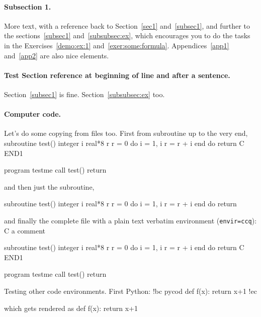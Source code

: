 \documentclass[%
oneside,                 %
final,                   %
10pt]{article}
\theoremstyle{definition}
\begin{document}
\paragraph{Subsection 1.}
\label{subsec1}
More text, with a reference back to
Section~\vref{sec1} and~\vref{subsec1}, and further to the
sections~\vref{subsec1} and~\vref{subsubsec:ex}, which
encourages you to do the tasks in the
Exercises~\vref{demo:ex:1} and~\vref{exer:some:formula}.
Appendices~\vref{app1} and~\vref{app2} are also nice elements.
\paragraph{Test Section reference at beginning of line and after a sentence.}
Section~\vref{subsec1} is fine.
Section~\vref{subsubsec:ex} too.
\paragraph{Computer code.}
Let's do some copying from files too. First from subroutine up to the very end,
\bfcod
      subroutine test()
      integer i
      real*8 r
      r = 0
      do i = 1, i
         r = r + i
      end do
      return
C     END1

      program testme
      call test()
      return

\efcod

and then just the subroutine,
\bfcod

      subroutine test()
      integer i
      real*8 r
      r = 0
      do i = 1, i
         r = r + i
      end do
      return

\efcod

and finally the complete file with a plain text verbatim environment
(\texttt{envir=ccq}):
\bccq
C     a comment

      subroutine test()
      integer i
      real*8 r
      r = 0
      do i = 1, i
         r = r + i
      end do
      return
C     END1

      program testme
      call test()
      return

\eccq

Testing other code environments. First Python:
\bdo
!bc pycod
def f(x):
    return x+1
!ec

\edo

which gets rendered as
\bpycod
def f(x):
    return x+1
\end{document}
